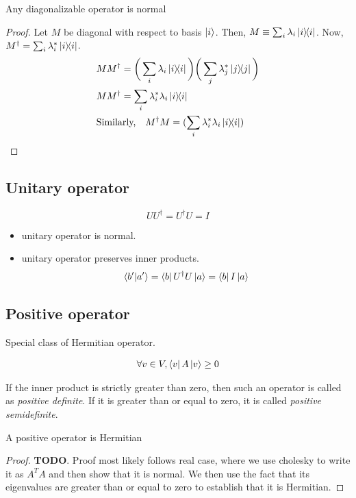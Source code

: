 \begin{theorem}
Any diagonalizable operator is normal
\end{theorem}
\begin{proof}
Let $M$ be diagonal with respect to basis $\ket{i}$.
Then, $M \equiv \sum_i \lambda_i \ketbra{i}$.
Now, $M^\dagger= \sum_i \lambda_i^* \ketbra{i}$. 
\begin{align*}
&M M^\dagger = \bigg(\sum_i \lambda_i \ketbra{i}\bigg)
    \bigg(\sum_j \lambda_j^* \ketbra{j}\bigg) \\
&M M^\dagger = \sum_i \lambda_i^* \lambda_i \ketbra{i} \\
&\text{Similarly,}  \quad M^\dagger M = (\sum_i \lambda_i^* \lambda_i \ketbra{i}) 
\end{align*}
\end{proof}

\subsection{Unitary operator}
\[ U U^\dagger = U^\dagger U = I \]
\begin{itemize}
\item unitary operator is normal.
\item unitary operator preserves inner products.
\begin{align*}
\bra{b'} \ket{a'} = \bra{b} U^\dagger U \ket{a} = \bra{b} I \ket{a}
\end{align*}
\end{itemize}

\subsection{Positive operator}
Special class of Hermitian operator.

\begin{align*}
 \forall v \in V, \bra v A \ket v \geq 0
\end{align*}

If the inner product is strictly greater than zero, then such an operator
is called as \emph{positive definite}. If it is greater than or equal
to zero, it is called \emph{positive semidefinite}.

\begin{theorem}
A positive operator is Hermitian
\end{theorem}
\begin{proof}
\textbf{TODO}. Proof most likely follows real case, where we use
cholesky to write it as $A^T A$ and then show that it is normal. We then
use the fact that its eigenvalues are greater than or equal to zero
to establish that it is Hermitian.
\end{proof}

